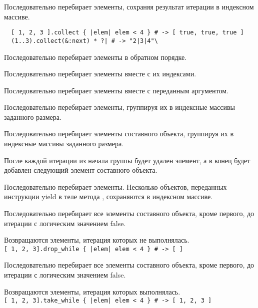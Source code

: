 \begin{methodlist}
  Последовательно перебирает элементы, сохраняя результат итерации в индексном массиве.
  \begin{verbatim}
  [ 1, 2, 3 ].collect { |elem| elem < 4 } # -> [ true, true, true ]
  (1..3).collect(&:next) * ?| # -> "2|3|4"\
  \end{verbatim}  

  Последовательно перебирает элементы в обратном порядке.
  
  Последовательно перебирает элементы вместе с их индексами. 
  
  Последовательно перебирает элементы вместе с переданным аргументом. 
  
  Последовательно перебирает элементы, группируя их в индексные массивы заданного размера. 
  
  Последовательно перебирает элементы составного объекта, группируя их в индексные массивы заданного размера. 

  После каждой итерации из начала группы будет удален элемент, а в конец будет добавлен следующий элемент составного объекта. 
  
  Последовательно перебирает элементы. Несколько объектов, переданных инструкции yield в теле метода , сохраняются в индексном массиве. 

  Последовательно перебирает все элементы составного объекта, кроме первого, до итерации с логическим значением false.

  Возвращаются элементы, итерация которых не выполнялась. 
  \\\verb![ 1, 2, 3].drop_while { |elem| elem < 4 } # -> [ ]!

  Последовательно перебирает все элементы составного объекта, кроме первого, до итерации с логическим значением false.

  Возвращаются элементы, итерация которых выполнялась. 
  \\\verb![ 1, 2, 3].take_while { |elem| elem < 4 } # -> [ 1, 2, 3 ]!


\end{methodlist}
